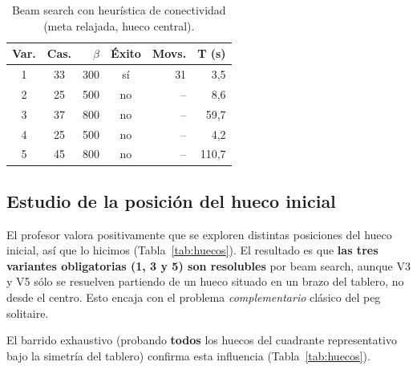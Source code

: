 \documentclass[conference,a4paper]{IEEEtran}
\begin{document}
\begin{table}[!htbp]
\caption{Beam search con heurística de conectividad (meta relajada, hueco central).}
\label{tab:conectividad}
\centering
\begin{tabular}{ccrcrr}
\toprule
\textbf{Var.} & \textbf{Cas.} & \textbf{$\beta$} & \textbf{Éxito} & \textbf{Movs.} & \textbf{T (s)} \\
\midrule
1 & 33 &  300 & sí & 31 &   3,5 \\
2 & 25 &  500 & no & -- &   8,6 \\
3 & 37 &  800 & no & -- &  59,7 \\
4 & 25 &  500 & no & -- &   4,2 \\
5 & 45 &  800 & no & -- & 110,7 \\
\bottomrule
\end{tabular}
\end{table}


\subsection{Estudio de la posición del hueco inicial}

El profesor valora positivamente que se exploren distintas posiciones
del hueco inicial, así que lo hicimos (Tabla~\ref{tab:huecos}). El
resultado es que \textbf{las tres variantes obligatorias (1, 3 y 5)
son resolubles} por beam search, aunque V3 y V5 sólo se resuelven
partiendo de un hueco situado en un brazo del tablero, no desde el
centro. Esto encaja con el problema \emph{complementario} clásico del
peg solitaire.

El barrido exhaustivo (probando \textbf{todos} los huecos del cuadrante
representativo bajo la simetría del tablero) confirma esta influencia
(Tabla~\ref{tab:huecos}).
\end{document}
